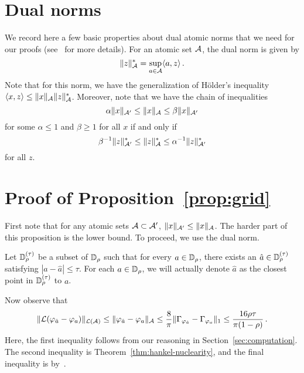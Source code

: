 \section{Dual norms}
We record here a few basic properties about dual atomic norms that we need for our proofs (see~\cite{crpw,BhaskarAllerton11} for more details).  For an atomic set $\mathcal{A}$, the dual norm is given by
\[
	\| z \|_{\mathcal{A}}^* = \sup_{a \in \mathcal{A}} \langle a, z \rangle\,.
\] 
Note that for this norm, we have the generalization of H\"{o}lder's inequality $\langle x,z\rangle \leq \|x\|_{\mathcal{A}}\|z\|_{\mathcal{A}}^*$.  Moreover, note that we have the chain of inequalities
\[
	 \alpha \|x\|_{\mathcal{A}'} \leq \|x\|_{\mathcal{A}} \leq \beta\|x\|_{\mathcal{A}'}
\]
for some $\alpha\leq 1$ and $\beta\geq 1$ for all $x$ if and only if
\[
	 \beta^{-1} \|z\|_{\mathcal{A}'}^* \leq \|z\|_{\mathcal{A}}^* \leq \alpha^{-1}\|z\|_{\mathcal{A}'}^*
\]
for all $z$.  

\section{Proof of Proposition~\ref{prop:grid}} First note that for any atomic sets $\mathcal{A} \subset \mathcal{A}'$, $\|x\|_{\mathcal{A}'} \leq \|x\|_{\mathcal{A}}$.  The harder part of this proposition is the lower bound.  To proceed, we use the dual norm. 

Let $\mathbb{D}_\rho^{(\tau)}$ be a subset of $\mathbb{D}_\rho$ such that for every $a \in \mathbb{D}_\rho$, there exists an $\hat{a}\in \mathbb{D}_\rho^{(\tau)}$ satisfying $|a-\hat{a}|\leq \tau$.  For each $a \in \mathbb{D}_\rho$, we will actually denote $\hat{a}$ as the closest point in $\mathbb{D}_\rho^{(\tau)}$ to $a$.

Now observe that 
\begin{align*}
	  \| \mathcal{L}(\varphi_{\hat{a}}-\varphi_a)\|_{\mathcal{L}(\mathcal{A})} \leq  \| \varphi_{\hat{a}}-\varphi_a\|_{\mathcal{A}}
	  \leq \frac{8}{\pi} \|\Gamma_{\varphi_{\hat{a}}}- \Gamma_{\varphi_a}\|_1 \leq \frac{16 \rho \tau}{\pi (1-\rho)}\,.
\end{align*}
Here, the first inequality follows from our reasoning in Section~\ref{sec:computation}.  The second inequality is Theorem~\ref{thm:hankel-nuclearity}, and the final inequality is by~.

